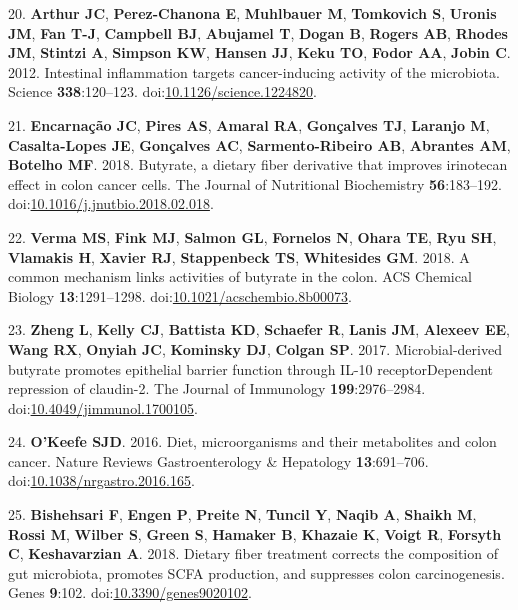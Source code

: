 \documentclass[11pt,]{article}
\begin{document}
\leavevmode\hypertarget{ref-Arthur2012}{}%
20. \textbf{Arthur JC}, \textbf{Perez-Chanona E}, \textbf{Muhlbauer M},
\textbf{Tomkovich S}, \textbf{Uronis JM}, \textbf{Fan T-J},
\textbf{Campbell BJ}, \textbf{Abujamel T}, \textbf{Dogan B},
\textbf{Rogers AB}, \textbf{Rhodes JM}, \textbf{Stintzi A},
\textbf{Simpson KW}, \textbf{Hansen JJ}, \textbf{Keku TO}, \textbf{Fodor
AA}, \textbf{Jobin C}. 2012. Intestinal inflammation targets
cancer-inducing activity of the microbiota. Science
\textbf{338}:120--123.
doi:\href{https://doi.org/10.1126/science.1224820}{10.1126/science.1224820}.

\leavevmode\hypertarget{ref-Encarnao2018}{}%
21. \textbf{Encarnação JC}, \textbf{Pires AS}, \textbf{Amaral RA},
\textbf{Gonçalves TJ}, \textbf{Laranjo M}, \textbf{Casalta-Lopes JE},
\textbf{Gonçalves AC}, \textbf{Sarmento-Ribeiro AB}, \textbf{Abrantes
AM}, \textbf{Botelho MF}. 2018. Butyrate, a dietary fiber derivative
that improves irinotecan effect in colon cancer cells. The Journal of
Nutritional Biochemistry \textbf{56}:183--192.
doi:\href{https://doi.org/10.1016/j.jnutbio.2018.02.018}{10.1016/j.jnutbio.2018.02.018}.

\leavevmode\hypertarget{ref-Verma2018}{}%
22. \textbf{Verma MS}, \textbf{Fink MJ}, \textbf{Salmon GL},
\textbf{Fornelos N}, \textbf{Ohara TE}, \textbf{Ryu SH},
\textbf{Vlamakis H}, \textbf{Xavier RJ}, \textbf{Stappenbeck TS},
\textbf{Whitesides GM}. 2018. A common mechanism links activities of
butyrate in the colon. ACS Chemical Biology \textbf{13}:1291--1298.
doi:\href{https://doi.org/10.1021/acschembio.8b00073}{10.1021/acschembio.8b00073}.

\leavevmode\hypertarget{ref-Zheng2017}{}%
23. \textbf{Zheng L}, \textbf{Kelly CJ}, \textbf{Battista KD},
\textbf{Schaefer R}, \textbf{Lanis JM}, \textbf{Alexeev EE},
\textbf{Wang RX}, \textbf{Onyiah JC}, \textbf{Kominsky DJ},
\textbf{Colgan SP}. 2017. Microbial-derived butyrate promotes epithelial
barrier function through IL-10 receptorDependent repression of
claudin-2. The Journal of Immunology \textbf{199}:2976--2984.
doi:\href{https://doi.org/10.4049/jimmunol.1700105}{10.4049/jimmunol.1700105}.

\leavevmode\hypertarget{ref-OKeefe2016}{}%
24. \textbf{O'Keefe SJD}. 2016. Diet, microorganisms and their
metabolites and colon cancer. Nature Reviews Gastroenterology \&
Hepatology \textbf{13}:691--706.
doi:\href{https://doi.org/10.1038/nrgastro.2016.165}{10.1038/nrgastro.2016.165}.

\leavevmode\hypertarget{ref-Bishehsari2018}{}%
25. \textbf{Bishehsari F}, \textbf{Engen P}, \textbf{Preite N},
\textbf{Tuncil Y}, \textbf{Naqib A}, \textbf{Shaikh M}, \textbf{Rossi
M}, \textbf{Wilber S}, \textbf{Green S}, \textbf{Hamaker B},
\textbf{Khazaie K}, \textbf{Voigt R}, \textbf{Forsyth C},
\textbf{Keshavarzian A}. 2018. Dietary fiber treatment corrects the
composition of gut microbiota, promotes SCFA production, and suppresses
colon carcinogenesis. Genes \textbf{9}:102.
doi:\href{https://doi.org/10.3390/genes9020102}{10.3390/genes9020102}.
\end{document}
